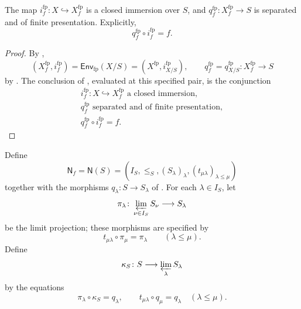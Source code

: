 \begin{lemma}
\checked
  \label{lemma:nagata-final-fp-envelope}

  The map $i_f^{\mathrm{fp}}\colon X\hookrightarrow X_f^{\mathrm{fp}}$ is a
  closed immersion over $S$, and
  $q_f^{\mathrm{fp}}\colon X_f^{\mathrm{fp}}\to S$ is separated and of
  finite presentation.  Explicitly,
  \[
    q_f^{\mathrm{fp}}\circ i_f^{\mathrm{fp}}=f.
  \]
\end{lemma}

\begin{proof}
  By ,
  \[
    (X_f^{\mathrm{fp}},i_f^{\mathrm{fp}})
      =\mathsf{Env}_{\mathrm{fp}}(X/S)
      =(X^{\mathrm{fp}},i^{\mathrm{fp}}_{X/S}),
    \qquad
    q_f^{\mathrm{fp}}=q^{\mathrm{fp}}_{X/S}
      \colon X_f^{\mathrm{fp}}\to S
  \]
  by .  The conclusion of
  , evaluated at this specified
  pair, is the conjunction
  \[
  \begin{gathered}
    i_f^{\mathrm{fp}}\colon X\hookrightarrow X_f^{\mathrm{fp}}
      \text{ a closed immersion},\\
    q_f^{\mathrm{fp}}\text{ separated and of finite presentation},\\
    q_f^{\mathrm{fp}}\circ i_f^{\mathrm{fp}}=f.
  \end{gathered}
  \]
\end{proof}

\begin{definition}
  \label{def:nagata-final-noetherian-base-system}
  \checked{}

  Define
  \[
    \mathsf N_f=\mathsf N(S)
      =(I_S,\leq_S,(S_\lambda)_\lambda,
        (t_{\mu\lambda})_{\lambda\leq\mu})
  \]
  together with the morphisms $q_\lambda\colon S\to S_\lambda$ of
  .  For each $\lambda\in I_S$, let
  \[
    \pi_\lambda\colon\varprojlim_{\nu\in I_S}S_\nu\longrightarrow S_\lambda
  \]
  be the limit projection; these morphisms are specified by
  \[
    t_{\mu\lambda}\circ\pi_\mu=\pi_\lambda
      \qquad(\lambda\leq\mu).
  \]
  Define
  \[
    \kappa_S\colon S\longrightarrow\varprojlim_\lambda S_\lambda
  \]
  by the equations
  \[
    \pi_\lambda\circ\kappa_S=q_\lambda,
    \qquad
    t_{\mu\lambda}\circ q_\mu=q_\lambda
      \quad(\lambda\leq\mu).
  \]
\end{definition}


